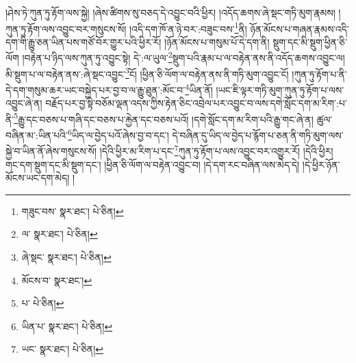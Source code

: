 །ཤེས་ཏེ་ཀུན་ཏུ་རྟོག་ལས་སྐྱེ། །ཞེས་ཚིགས་སུ་བཅད་དེ་འབྱུང་བའི་ཕྱིར། །འདོད་ཆགས་ཞེ་སྡང་གཏི་མུག་རྣམས། །ཀུན་ཏུ་རྟོག་ལས་འབྱུང་བར་གསུངས་སོ། །འདི་དག་ཁོ་ན་ཉེ་བར་:བཟུང་བས་\footnote{གཟུང་བས་  སྣར་ཐང་།  པེ་ཅིན། }ནི། ཉོན་མོངས་པ་གཞན་རྣམས་འདི་དག་གི་རྒྱུ་ཅན་ཡིན་པས་གཙོ་བོར་གྱུར་པའི་ཕྱིར་རོ། །ཉོན་མོངས་པ་གསུམ་པོ་དེ་དག་ནི། སྡུག་དང་མི་སྡུག་ཕྱིན་ཅི་ལོག །བརྟེན་པ་ཉིད་ལས་ཀུན་ཏུ་འབྱུང་སྟེ། དེ་:ལ་ཡུལ་\footnote{ལ་  སྣར་ཐང་།  པེ་ཅིན། }སྡུག་པའི་རྣམ་པ་ལ་བརྟེན་ནས་ནི་འདོད་ཆགས་འབྱུང་ལ། མི་སྡུག་པ་ལ་བརྟེན་ནས་:ཞེ་སྡང་འབྱུང་\footnote{ཞེ་སྡང་  སྣར་ཐང་།  པེ་ཅིན། }ངོ། །ཕྱིན་ཅི་ལོག་ལ་བརྟེན་ནས་ནི་གཏི་མུག་འབྱུང་ངོ། །ཀུན་ཏུ་རྟོག་པ་ནི་དེ་དག་གསུམ་ཆར་ཡང་བསྐྱེད་པར་བྱ་བ་ལ་རྒྱུ་ཐུན་:མོང་བ་\footnote{མོངས་བ་  སྣར་ཐང་། }ཡིན་ནོ། །ཡང་ཇི་ལྟར་གཏི་མུག་ཀུན་ཏུ་རྟོག་པ་ལས་འབྱུང་ཞེ་ན། བརྗོད་པར་བྱ་སྟེ་བཅོམ་ལྡན་འདས་ཀྱིས་རྟེན་ཅིང་འབྲེལ་པར་འབྱུང་བ་ལས་དགེ་སློང་དག་མ་རིག་:པ་ནི་\footnote{པ་  པེ་ཅིན། }རྒྱུ་དང་བཅས་པ་གཞི་དང་བཅས་པ་རྐྱེན་དང་བཅས་པའོ། །དགེ་སློང་དག་མ་རིག་པའི་རྒྱུ་གང་ཞེ་ན། ཚུལ་བཞིན་མ་:ཡིན་པའི་\footnote{ཡིན་པ་  སྣར་ཐང་།  པེ་ཅིན། }ཡིད་ལ་བྱེད་པའོ་ཞེས་བྱ་བ་དང་། དེ་བཞིན་དུ་ཡིད་ལ་བྱེད་པ་རྙོག་པ་ཅན་ནི་གཏི་མུག་ལས་སྐྱེ་བ་ཡིན་ནོ་ཞེས་གསུངས་སོ། །དེའི་ཕྱིར་མ་རིག་པ་དང་\footnote{ཡང་  སྣར་ཐང་།  པེ་ཅིན། }ཀུན་ཏུ་རྟོག་པ་ལས་འབྱུང་བར་འགྱུར་རོ། །དེའི་ཕྱིར། གང་དག་སྡུག་དང་མི་སྡུག་དང་། །ཕྱིན་ཅི་ལོག་ལ་བརྟེན་འབྱུང་བ། །དེ་དག་རང་བཞིན་ལས་མེད་དེ། །དེ་ཕྱིར་ཉོན་མོངས་ཡང་དག་མེད། །
